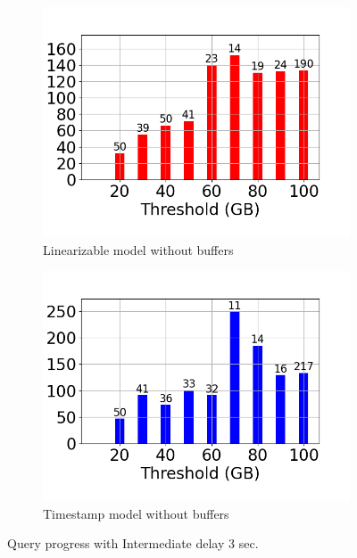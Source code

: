 \begin{figure}
\begin{subfigure}[c]{0.48\textwidth}
		\label{fig:progress-queries-3-system}
	\end{subfigure}
	\begin{subfigure}[c]{0.48\textwidth}
		\includegraphics[width=1\textwidth]   {figures/Experiments/Dynamic/Progress/3/average_query_time_per_batch_version_999777016_10485760_10_delay[3].png}
		\caption{Linearizable model without buffers}
		\label{fig:progress-queries-3-logical-no-buffers}
	\end{subfigure}
	\begin{subfigure}[c]{0.48\textwidth}
		\includegraphics[width=1\textwidth]   {figures/Experiments/Dynamic/Progress/3/average_query_time_per_batch_version_999777017_10485760_10_delay[3].png}
		\caption{Timestamp model without buffers}
		\label{fig:progress-queries-3-system-no-buffers}
	\end{subfigure}
	\caption{Query progress with Intermediate delay 3 sec.}
	\label{fig:query-progress-delay-3}
\end{figure}


